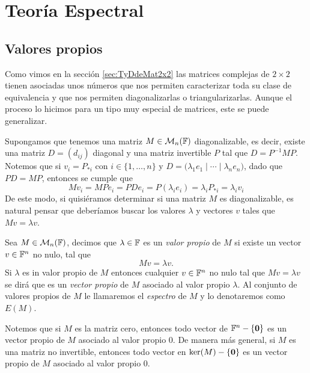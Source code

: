 \chapter{Teoría Espectral}

\section{Valores propios}

Como vimos en la sección \ref{sec:TyDdeMat2x2} las matrices complejas de $2\times 2$ tienen asociadas unos números que nos permiten caracterizar toda su clase de equivalencia y que nos permiten diagonalizarlas o triangularizarlas. Aunque el proceso lo hicimos para un tipo muy especial de matrices, este se puede generalizar.

Supongamos que tenemos una matriz $M\in\mathcal{M}_n(\mathbb{F})$ diagonalizable, es decir, existe una matriz $D = (d_{ij})$ diagonal y una matriz invertible $P$ tal que $D =  P^{-1}MP$. Notemos que si $v_i = P_{*i}$ con $i \in \{1,\ldots,n\}$ y $D = \bigl( \lambda_1 e_1 \mid \cdots \mid \lambda_n e_n \bigr)$, dado que $PD = MP$, entonces se cumple que
  \[
    Mv_i = MPe_i = PD e_i = P(\lambda_i e_i) = \lambda_i P_{*i} = \lambda_i v_i
  \]
De este modo, si quisiéramos determinar si una matriz $M$ es diagonalizable, es natural pensar que deberíamos buscar los valores $\lambda$ y vectores $v$ tales que $Mv = \lambda v$.

\begin{defi}
  Sea $M \in \mathcal{M}_n(\mathbb{F})$, decimos que $\lambda \in \mathbb{F}$ es un \emph{valor propio} de $M$ si existe un vector $v \in \mathbb{F}^n$ no nulo, tal que
    \[Mv = \lambda v.\]
  Si $\lambda$ es in valor propio de $M$ entonces cualquier $v \in \mathbb{F}^n$ no nulo tal que $Mv = \lambda v$ se dirá que es un \emph{vector propio} de $M$ asociado al valor propio $\lambda$. Al conjunto de valores propios de $M$ le llamaremos el \emph{espectro} de $M$ y lo denotaremos como $E(M)$.
\end{defi}

Notemos que si $M$ es la matriz cero, entonces todo vector de $\mathbb{F}^n - \{\mathbf{0}\}$ es un vector propio de $M$ asociado al valor propio $0$. De manera más general, si $M$ es una matriz no invertible, entonces todo vector en $\ker(M)-\{\mathbf{0}\}$ es un vector propio de $M$ asociado al valor propio $0$.

